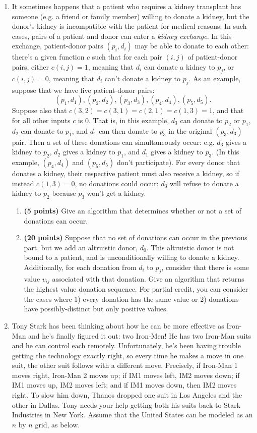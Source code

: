 \documentclass[11pt]{article}
\begin{document}
\begin{enumerate}
\item It sometimes happens that a patient who requires a kidney transplant has someone (e.g. a friend or family member) willing to donate a kidney, but the donor's kidney is incompatible with the patient for medical reasons. In such cases, pairs of a patient and donor can enter a \emph{kidney exchange}. In this exchange, patient-donor pairs $(p_i,d_i)$ may be able to donate to each other: there's a given function $c$ such that for each pair $(i,j)$ of patient-donor pairs, either $c(i,j) = 1$, meaning that $d_i$ can donate a kidney to $p_j$, or $c(i,j) = 0$, meaning that $d_i$ can't donate a kidney to $p_j$. As an example, suppose that we have five patient-donor pairs: $$(p_1,d_1), (p_2,d_2), (p_3,d_3), (p_4,d_4), (p_5,d_5).$$ Suppose also that $c(3,2) = c(3,1) = c(2,1) = c(1,3) = 1$, and that for all other inputs $c$ is 0. That is, in this example, $d_3$ can donate to $p_2$ or $p_1$, $d_2$ can donate to $p_1$, and $d_1$ can then donate to $p_3$ in the original $(p_3,d_3)$ pair. Then a set of these donations can simultaneously occur: e.g. $d_3$ gives a kidney to $p_2$, $d_2$ gives a kidney to $p_1$, and $d_1$ gives a kidney to $p_3$. (In this example, $(p_4,d_4)$ and $(p_5,d_5)$ don't participate). For every donor that donates a kidney, their respective patient must also receive a kidney, so if instead $c(1,3) = 0$, no donations could occur: $d_3$ will refuse to donate a kidney to $p_2$ because $p_3$ won't get a kidney.
\begin{enumerate}
    \item {\bf (5 points)} Give an algorithm that determines whether or not a set of donations can occur. 
    \item {\bf (20 points)} Suppose that no set of donations can occur in the previous part, but we add an altruistic donor, $d_0$. This altruistic donor is not bound to a patient, and is unconditionally willing to donate a kidney. Additionally, for each donation from $d_i$ to $p_j$, consider that there is some value $v_{ij}$ associated with that donation. Give an algorithm that returns the highest value donation sequence. For partial credit, you can consider the cases where 1) every donation has the same value or 2) donations have possibly-distinct but only positive values. 
\end{enumerate}
    

\item Tony Stark has been thinking about how he can be more effective as Iron-Man and he's finally figured it out: two Iron-Men! He has two Iron-Man suits and he can control each remotely. Unfortunately, he's been having trouble getting the technology exactly right, so every time he makes a move in one suit, the other suit follows with a different move. Precisely, if Iron-Man 1 moves right, Iron-Man 2 moves up; if IM1 moves left, IM2 moves down; if IM1 moves up, IM2 moves left; and if IM1 moves down, then IM2 moves right. To slow him down, Thanos dropped one suit in Los Angeles and the other in Dallas. Tony needs your help getting both his suits back to Stark Industries in New York.
Assume that the United States can be modeled as an $n$ by $n$ grid, as below.


\end{enumerate}
\end{document}
